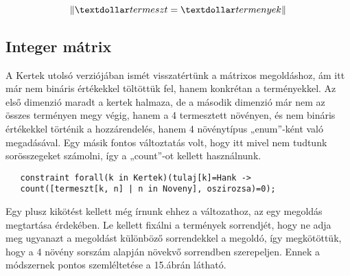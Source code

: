 \documentclass[12pt,a4paper,twoside, openright]{report}
\begin{document}
    \begin{equation}
     \left\| \textdollar termeszt= \textdollar termenyek \right\| 
    \end{equation}

\subsection{Integer mátrix}

    A Kertek utolsó verziójában ismét visszatértünk a mátrixos megoldáshoz, ám itt már nem bináris értékekkel töltöttük fel, hanem konkrétan a terményekkel.
    Az első dimenzió maradt a kertek halmaza, de a második dimenzió már nem az összes terményen megy végig, hanem a 4 termesztett növényen, és nem bináris értékekkel történik a hozzárendelés, hanem 4 növénytípus „enum”-ként való megadásával.
    Egy másik fontos változtatás volt, hogy itt mivel nem tudtunk sorösszegeket számolni, így a „count”-ot kellett használnunk.

   \begin{lstlisting}
   constraint forall(k in Kertek)(tulaj[k]=Hank ->
   count([termeszt[k, n] | n in Noveny], oszirozsa)=0); \end{lstlisting}

    Egy plusz kikötést kellett még írnunk ehhez a változathoz, az egy megoldás megtartása érdekében.
    Le kellett fixálni a termények sorrendjét, hogy ne adja meg ugyanazt a megoldást különböző sorrendekkel a megoldó, így megkötöttük, hogy a 4 növény sorszám alapján növekvő sorrendben szerepeljen.
    Ennek a módszernek pontos szemléltetése a 15.ábrán látható.
\end{document}
